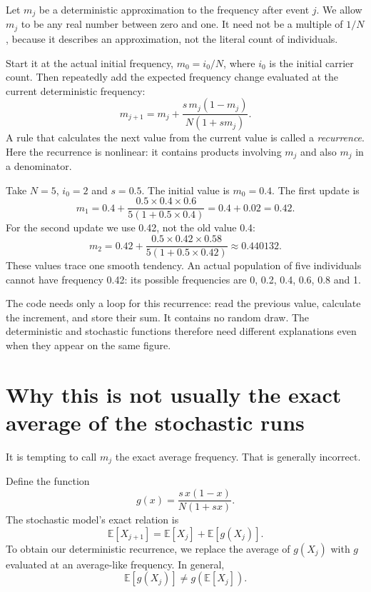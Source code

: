 Let $m_j$ be a deterministic approximation to the frequency after event $j$. We allow $m_j$ to be any real number between zero and one. It need not be a multiple of $1/N$, because it describes an approximation, not the literal count of individuals.

Start it at the actual initial frequency, $m_0=i_0/N$, where $i_0$ is the initial carrier count. Then repeatedly add the expected frequency change evaluated at the current deterministic frequency:
\begin{equation}
m_{j+1}=m_j+
\frac{s\,m_j(1-m_j)}{N(1+s m_j)}.
\label{eq:deterministic-recurrence}
\end{equation}
A rule that calculates the next value from the current value is called a \emph{recurrence}. Here the recurrence is nonlinear: it contains products involving $m_j$ and also $m_j$ in a denominator.

\begin{workedexample}
Take $N=5$, $i_0=2$ and $s=0.5$. The initial value is $m_0=0.4$. The first update is
\[
m_1=0.4+\frac{0.5\times0.4\times0.6}{5(1+0.5\times0.4)}
    =0.4+0.02=0.42.
\]
For the second update we use 0.42, not the old value 0.4:
\[
m_2=0.42+\frac{0.5\times0.42\times0.58}{5(1+0.5\times0.42)}
\approx0.440132.
\]
These values trace one smooth tendency. An actual population of five individuals cannot have frequency 0.42: its possible frequencies are 0, 0.2, 0.4, 0.6, 0.8 and 1.
\end{workedexample}

The code needs only a loop for this recurrence: read the previous value, calculate the increment, and store their sum. It contains no random draw. The deterministic and stochastic functions therefore need different explanations even when they appear on the same figure.

\section{Why this is not usually the exact average of the stochastic runs}

It is tempting to call $m_j$ the exact average frequency. That is generally incorrect.

Define the function
\[
g(x)=\frac{s\,x(1-x)}{N(1+sx)}.
\]
The stochastic model's exact relation is
\[
\mathbb E[X_{j+1}]=\mathbb E[X_j]+\mathbb E[g(X_j)].
\]
To obtain our deterministic recurrence, we replace the average of $g(X_j)$ with $g$ evaluated at an average-like frequency. In general,
\[
\mathbb E[g(X_j)]\ne g(\mathbb E[X_j]).
\]

